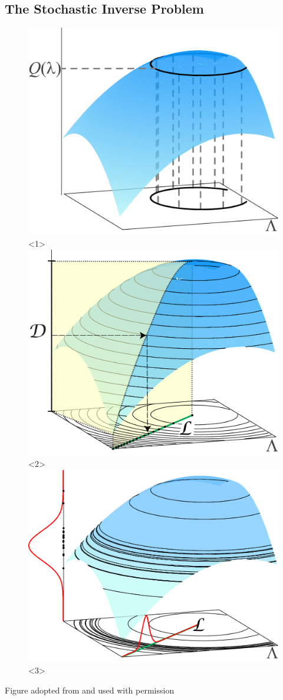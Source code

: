 \subsection{The Stochastic Inverse Problem}
\begin{frame}[t]

\begin{figure}
\centering
	\includegraphics[width=.65\textwidth]{images/illustration1.pdf}<1>
	\includegraphics[width=.65\textwidth]{images/illustration2.pdf}<2>
	\includegraphics[width=.7\textwidth]{images/illustration3.pdf}<3>
\end{figure}
\begin{center}
{\scriptsize Figure adopted from \cite{BET14+} and used with permission}
\end{center}
\end{frame}

